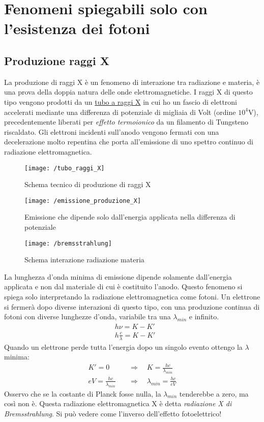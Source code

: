 

\section{Fenomeni spiegabili solo con l'esistenza dei fotoni}


\subsection{Produzione raggi X}
La produzione di raggi X è un fenomeno di interazione tra radiazione e materia, è una prova della doppia natura delle onde elettromagnetiche.
I raggi X di questo tipo vengono prodotti da un \underline{tubo a raggi X} in cui ho un fascio di elettroni accelerati mediante una differenza di potenziale di migliaia di Volt (ordine $10^4$V), precedentemente liberati per \textit{effetto termoionico} da un filamento di Tungsteno riscaldato.
Gli elettroni incidenti sull'anodo vengono fermati con una decelerazione molto repentina che porta all'emissione di uno spettro continuo di radiazione elettromagnetica.
\begin{figure}[h]
\centering
\texttt{[image: /tubo\_raggi\_X]}
\caption{Schema tecnico di produzione di raggi X}
\end{figure}
\begin{figure}[h]
\centering
\texttt{[image: /emissione\_produzione\_X]}
\caption{Emissione che dipende solo dall'energia applicata nella differenza di potenziale}
\end{figure}
\begin{figure}[h]
\centering
\texttt{[image: /bremsstrahlung]}
\caption{Schema interazione radiazione materia}
\end{figure}

La lunghezza d'onda minima di emissione dipende solamente dall'energia applicata e non dal materiale di cui è costituito l'anodo.
Questo fenomeno si spiega solo interpretando la radiazione elettromagnetica come fotoni.
Un elettrone si fermerà dopo diverse interazioni di questo tipo, con una produzione continua di fotoni con diverse lunghezze d'onda,
variabile tra una $\lambda_{min}$ e infinito.
\begin{equation}
\begin{split}
& h\nu = K - K' \\
& h \frac{ c}{\lambda } = K - K'
\end{split}
\end{equation}
Quando un elettrone perde tutta l'energia dopo un singolo evento ottengo la $\lambda$ minima:
\begin{equation}
\begin{split}
K' = 0 \quad & \Rightarrow \quad K = \frac{ hc}{\lambda_{min} } \\
eV = \frac{ hc}{\lambda_{min} } \quad & \Rightarrow \quad \lambda_{min} = \frac{ hc}{eV }
\end{split}
\end{equation}
Osservo che se la costante di Planck fosse nulla, la $\lambda_{min}$ tenderebbe a zero, ma così non è.
Questa radiazione elettromagnetica X è detta \textit{radiazione X di Bremsstrahlung}.
Si può vedere come l'inverso dell'effetto fotoelettrico!


